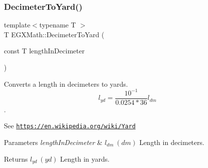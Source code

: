 \subsubsection{\texorpdfstring{Decimeter\+To\+Yard()}{DecimeterToYard()}}
{\footnotesize\ttfamily template$<$typename T $>$ \\
T E\+G\+X\+Math\+::\+Decimeter\+To\+Yard (\begin{DoxyParamCaption}\item[{const T}]{length\+In\+Decimeter }\end{DoxyParamCaption})}



Converts a length in decimeters to yards. \[ l_{yd}= \frac{10^{-1}}{0.0254 * 36} l_{dm} \]. 

See \href{https://en.wikipedia.org/wiki/Yard}{\tt https\+://en.\+wikipedia.\+org/wiki/\+Yard} 
\begin{DoxyParams}{Parameters}
{\em length\+In\+Decimeter} & $ l_{dm}\ (dm)$ Length in decimeters. \\
\hline
\end{DoxyParams}
\begin{DoxyReturn}{Returns}
$ l_{yd}\ (yd)$ Length in yards. 
\end{DoxyReturn}

